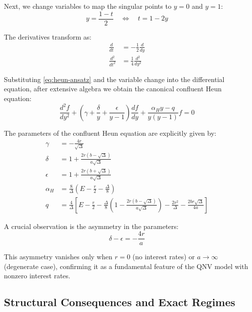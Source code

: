 \documentclass[a4paper,11pt]{article}
\begin{document}
Next, we change variables to map the singular points to $y = 0$ and $y = 1$:
\begin{equation}
y = \frac{1 - t}{2} \quad \Leftrightarrow \quad t = 1 - 2y
\end{equation}

The derivatives transform as:
\begin{align}
\frac{d}{dt} &= -\frac{1}{2}\frac{d}{dy} \\
\frac{d^2}{dt^2} &= \frac{1}{4}\frac{d^2}{dy^2}
\end{align}

Substituting \eqref{eq:heun-ansatz} and the variable change into the differential equation, after extensive algebra we obtain the canonical confluent Heun equation:
\begin{equation}
\frac{d^2f}{dy^2} + \left(\gamma + \frac{\delta}{y} + \frac{\epsilon}{y-1}\right)\frac{df}{dy} + \frac{\alpha_H y - q}{y(y-1)}f = 0
\label{eq:confluent-heun}
\end{equation}

The parameters of the confluent Heun equation are explicitly given by:
\begin{align}
\gamma &= -\frac{4r}{\sqrt{\Delta}} \\
\delta &= 1 + \frac{2r(b - \sqrt{\Delta})}{a\sqrt{\Delta}} \\
\epsilon &= 1 + \frac{2r(b + \sqrt{\Delta})}{a\sqrt{\Delta}} \\
\alpha_H &= \frac{8}{\Delta}\left(E - \frac{r}{2} - \frac{\Delta}{8}\right) \\
q &= \frac{4}{\Delta}\left[E - \frac{r}{2} - \frac{\Delta}{8}\left(1 - \frac{2r(b - \sqrt{\Delta})}{a\sqrt{\Delta}}\right) - \frac{2r^2}{\Delta} - \frac{2br\sqrt{\Delta}}{4a}\right]
\end{align}

A crucial observation is the asymmetry in the parameters:
\begin{equation}
\delta - \epsilon = -\frac{4r}{a}
\label{eq:asymmetry}
\end{equation}

This asymmetry vanishes only when $r = 0$ (no interest rates) or $a \to \infty$ (degenerate case), confirming it as a fundamental feature of the QNV model with nonzero interest rates.

\subsection{Structural Consequences and Exact Regimes}
\end{document}
